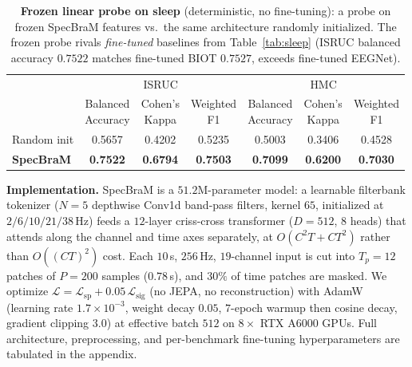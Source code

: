 \documentclass[letterpaper]{article} %
\begin{document}
\begin{table}[t]\centering\small
\setlength{\tabcolsep}{7pt}
\caption{\textbf{Frozen linear probe on sleep} (deterministic, no fine-tuning): a
probe on frozen SpecBraM features vs.\ the same architecture randomly initialized.
The frozen probe rivals \emph{fine-tuned} baselines from Table~\ref{tab:sleep}
(ISRUC balanced accuracy $0.7522$ matches fine-tuned BIOT $0.7527$, exceeds
fine-tuned EEGNet).}
\label{tab:frozensleep}
\begin{tabular}{l ccc ccc}
\toprule
& \multicolumn{3}{c}{ISRUC} & \multicolumn{3}{c}{HMC}\\
\cmidrule(lr){2-4}\cmidrule(lr){5-7}
& \shortstack{Balanced\\Accuracy} & \shortstack{Cohen's\\Kappa} & \shortstack{Weighted\\F1}
& \shortstack{Balanced\\Accuracy} & \shortstack{Cohen's\\Kappa} & \shortstack{Weighted\\F1}\\
\midrule
Random init   & 0.5657 & 0.4202 & 0.5235 & 0.5003 & 0.3406 & 0.4528\\
\textbf{SpecBraM} & \textbf{0.7522} & \textbf{0.6794} & \textbf{0.7503} & \textbf{0.7099} & \textbf{0.6200} & \textbf{0.7030}\\
\bottomrule
\end{tabular}
\end{table}


\noindent\textbf{Implementation.} SpecBraM is a $51.2$M-parameter model: a learnable
filterbank tokenizer ($N{=}5$ depthwise Conv1d band-pass filters, kernel $65$,
initialized at $2/6/10/21/38$\,Hz) feeds a $12$-layer criss-cross transformer
($D{=}512$, $8$ heads) that attends along the channel and time axes separately, at
$O(C^2T{+}CT^2)$ rather than $O((CT)^2)$ cost. Each $10$\,s, $256$\,Hz,
$19$-channel input is cut into $T_p{=}12$ patches of $P{=}200$ samples ($0.78$\,s),
and $30\%$ of time patches are masked. We optimize
$\mathcal{L}=\mathcal{L}_{\mathrm{sp}}+0.05\,\mathcal{L}_{\mathrm{sig}}$ (no JEPA, no
reconstruction) with AdamW (learning rate $1.7{\times}10^{-3}$, weight decay
$0.05$, $7$-epoch warmup then cosine decay, gradient clipping $3.0$) at effective
batch $512$ on $8{\times}$ RTX A6000 GPUs. Full architecture, preprocessing, and
per-benchmark fine-tuning hyperparameters are tabulated in the appendix.
\end{document}
